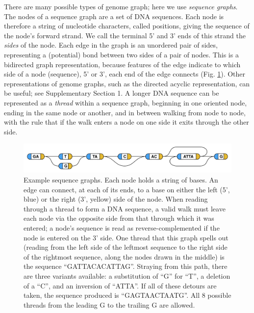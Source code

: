 There are many possible types of genome graph; here we use
\emph{sequence graphs}. The nodes of a sequence graph are a set of DNA
sequences. Each node is therefore a string of nucleotide characters,
called positions, giving the sequence of the node's forward strand. We
call the terminal 5' and 3' ends of this strand the \emph{sides} of the
node. Each edge in the graph is an unordered pair of sides, representing
a (potential) bond between two sides of a pair of nodes. This is a
bidirected graph representation, because features of the edge indicate
to which side of a node (sequence), 5' or 3', each end of the edge
connects (Fig. \ref{fig:bakeoff:example})\cite{medvedev2009maximum}. Other representations of genome
graphs, such as the directed acyclic representation, can be useful; see
Supplementary Section 1. A longer DNA sequence can be represented as a
\emph{thread} within a sequence graph, beginning in one oriented node,
ending in the same node or another, and in between walking from node to
node, with the rule that if the walk enters a node on one side it exits
through the other side.

\begin{figure}[htbp]
\centering
\includegraphics[width=\textwidth]{figures/04_bakeoff/figure01.png}
\caption[Example sequence graphs]{Example sequence graphs. Each node holds a string of bases. An
edge can connect, at each of its ends, to a base on either the left (5',
blue) or the right (3', yellow) side of the node. When reading through a
thread to form a DNA sequence, a valid walk must leave each node via the
opposite side from that through which it was entered; a node's sequence
is read as reverse-complemented if the node is entered on the 3' side.
One thread that this graph spells out (reading from the left side of the
leftmost sequence to the right side of the rightmost sequence, along the
nodes drawn in the middle) is the sequence ``GATTACACATTAG''. Straying
from this path, there are three variants available: a substitution of
``G'' for ``T'', a deletion of a ``C'', and an inversion of ``ATTA''. If
all of these detours are taken, the sequence produced is
``GAGTAACTAATG''. All 8 possible threads from the leading G to the
trailing G are allowed.}
\label{fig:bakeoff:example}
\end{figure}



